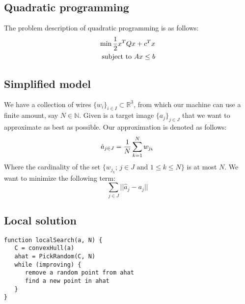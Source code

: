 \documentclass[10pt,a4paper]{article}
\newcommand{\R}{\mathbb{R}}
\newcommand{\N}{\mathbb{N}}
\begin{document}
	\subsection*{Quadratic programming}
	The problem description of quadratic programming is as follows:
	\begin{align*}
	\min {1 \over 2} x^T Q x + c^T x\\
	\text{subject to } Ax \leq b
	\end{align*}
	
	\subsection*{Simplified model}
	We have a collection of wires $\{w_i\}_{i \in I} \subset \R^3$, from which our machine can use a finite amount, say $N \in \N$.
	Given is a target image $\{a_j\}_{j \in J}$ that we want to approximate as best as possible.
	Our approximation is denoted as follows:
	\begin{equation}
	\hat{a}_{j \in J} = {1 \over N} \sum_{k=1}^{N} w_{j_k} 
	\end{equation}
	Where the cardinality of the set $\{w_{j_k}; \, j\in J \text{ and } 1 \leq k \leq N \}$ is at most $N$.
	We want to minimize the following term:
	\begin{equation}
	\sum_{j\in J} || \hat{a}_j - a_j || 
	\end{equation}
	
	\subsection*{Local solution}
	\begin{lstlisting}[caption={A algorithm to find a local solution},basicstyle=\small]
function localSearch(a, N) {
   C = convexHull(a)
   ahat = PickRandom(C, N)
   while (improving) {
      remove a random point from ahat
      find a new point in ahat
   }
}
	\end{lstlisting}
\end{document}
